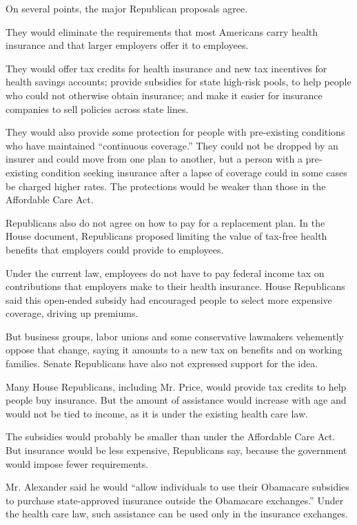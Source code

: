 On several points, the major Republican proposals agree.

They would eliminate the requirements that most Americans carry health
insurance and that larger employers offer it to employees.

They would offer tax credits for health insurance and new tax incentives
for health savings accounts; provide subsidies for state high-risk
pools, to help people who could not otherwise obtain insurance; and make
it easier for insurance companies to sell policies across state lines.

They would also provide some protection for people with pre-existing
conditions who have maintained ``continuous coverage.'' They could not
be dropped by an insurer and could move from one plan to another, but a
person with a pre-existing condition seeking insurance after a lapse of
coverage could in some cases be charged higher rates. The protections
would be weaker than those in the Affordable Care Act.

Republicans also do not agree on how to pay for a replacement plan. In
the House document, Republicans proposed limiting the value of tax-free
health benefits that employers could provide to employees.

Under the current law, employees do not have to pay federal income tax
on contributions that employers make to their health insurance. House
Republicans said this open-ended subsidy had encouraged people to select
more expensive coverage, driving up premiums.

But business groups, labor unions and some conservative lawmakers
vehemently oppose that change, saying it amounts to a new tax on
benefits and on working families. Senate Republicans have also not
expressed support for the idea.

Many House Republicans, including Mr. Price, would provide tax credits
to help people buy insurance. But the amount of assistance would
increase with age and would not be tied to income, as it is under the
existing health care law.

The subsidies would probably be smaller than under the Affordable Care
Act. But insurance would be less expensive, Republicans say, because the
government would impose fewer requirements.

Mr. Alexander said he would ``allow individuals to use their Obamacare
subsidies to purchase state-approved insurance outside the Obamacare
exchanges.'' Under the health care law, such assistance can be used only
in the insurance exchanges.

